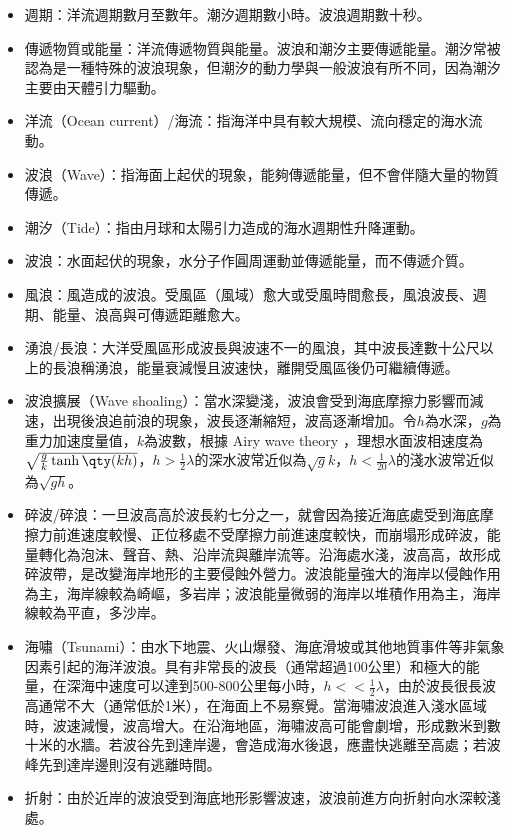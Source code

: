 \documentclass[a4paper,12pt]{report}
\begin{document}
\begin{itemize}
\item 週期：洋流週期數月至數年。潮汐週期數小時。波浪週期數十秒。
\item 傳遞物質或能量：洋流傳遞物質與能量。波浪和潮汐主要傳遞能量。潮汐常被認為是一種特殊的波浪現象，但潮汐的動力學與一般波浪有所不同，因為潮汐主要由天體引力驅動。
\item 洋流（Ocean current）/海流：指海洋中具有較大規模、流向穩定的海水流動。
\item 波浪（Wave）：指海面上起伏的現象，能夠傳遞能量，但不會伴隨大量的物質傳遞。
\item 潮汐（Tide）：指由月球和太陽引力造成的海水週期性升降運動。
\end{itemize}
\begin{itemize}
\item 波浪：水面起伏的現象，水分子作圓周運動並傳遞能量，而不傳遞介質。
\item 風浪：風造成的波浪。受風區（風域）愈大或受風時間愈長，風浪波長、週期、能量、浪高與可傳遞距離愈大。
\item 湧浪/長浪：大洋受風區形成波長與波速不一的風浪，其中波長達數十公尺以上的長浪稱湧浪，能量衰減慢且波速快，離開受風區後仍可繼續傳遞。
\item 波浪擴展（Wave shoaling）：當水深變淺，波浪會受到海底摩擦力影響而減速，出現後浪追前浪的現象，波長逐漸縮短，波高逐漸增加。令$h$為水深，$g$為重力加速度量值，$k$為波數，根據 Airy wave theory ，理想水面波相速度為$\sqrt{\frac{g}{k}\tanh\qty(kh)}$，$h>\frac{1}{2}\lambda$的深水波常近似為$\sqrt{g}{k}$，$h<\frac{1}{20}\lambda$的淺水波常近似為$\sqrt{gh}$。
\item 碎波/碎浪：一旦波高高於波長約七分之一，就會因為接近海底處受到海底摩擦力前進速度較慢、正位移處不受摩擦力前進速度較快，而崩塌形成碎波，能量轉化為泡沫、聲音、熱、沿岸流與離岸流等。沿海處水淺，波高高，故形成碎波帶，是改變海岸地形的主要侵蝕外營力。波浪能量強大的海岸以侵蝕作用為主，海岸線較為崎嶇，多岩岸；波浪能量微弱的海岸以堆積作用為主，海岸線較為平直，多沙岸。
\item 海嘯（Tsunami）：由水下地震、火山爆發、海底滑坡或其他地質事件等非氣象因素引起的海洋波浪。具有非常長的波長（通常超過100公里）和極大的能量，在深海中速度可以達到500-800公里每小時，$h<<\frac{1}{2}\lambda$，由於波長很長波高通常不大（通常低於1米），在海面上不易察覺。當海嘯波浪進入淺水區域時，波速減慢，波高增大。在沿海地區，海嘯波高可能會劇增，形成數米到數十米的水牆。若波谷先到達岸邊，會造成海水後退，應盡快逃離至高處；若波峰先到達岸邊則沒有逃離時間。
\item 折射：由於近岸的波浪受到海底地形影響波速，波浪前進方向折射向水深較淺處。

\end{itemize}
\end{document}
